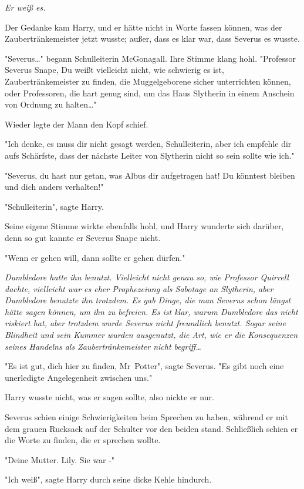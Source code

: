 {\emph{Er weiß es.}

Der Gedanke kam Harry, und er hätte nicht in Worte fassen können, was der Zaubertränkemeister jetzt wusste; außer, dass es klar war, dass Severus es wusste.

"Severus…" begann Schulleiterin McGonagall. Ihre Stimme klang hohl. "Professor Severus Snape, Du weißt vielleicht nicht, wie schwierig es ist, Zaubertränkemeister zu finden, die Muggelgeborene sicher unterrichten können, oder Professoren, die hart genug sind, um das Haus Slytherin in einem Anschein von Ordnung zu halten…"

Wieder legte der Mann den Kopf schief.

"Ich denke, es muss dir nicht gesagt werden, Schulleiterin, aber ich empfehle dir aufs Schärfste, dass der nächste Leiter von Slytherin nicht so sein sollte wie ich."

"Severus, du hast nur getan, was Albus dir aufgetragen hat! Du könntest bleiben und dich anders verhalten!"

"Schulleiterin", sagte Harry.

Seine eigene Stimme wirkte ebenfalls hohl, und Harry wunderte sich darüber, denn so gut kannte er Severus Snape nicht.

"Wenn er gehen will, dann sollte er gehen dürfen."

\emph{Dumbledore hatte ihn benutzt. Vielleicht nicht genau so, wie Professor Quirrell dachte, vielleicht war es eher Prophezeiung als Sabotage an Slytherin, aber Dumbledore benutzte ihn trotzdem. Es gab Dinge, die man Severus schon längst hätte sagen können, um ihn zu befreien. Es ist klar, warum Dumbledore das nicht riskiert hat, aber trotzdem wurde Severus nicht freundlich benutzt. Sogar seine Blindheit und sein Kummer wurden ausgenutzt, die Art, wie er die Konsequenzen seines Handelns als Zaubertränkemeister nicht begriff…}

"Es ist gut, dich hier zu finden, Mr~Potter", sagte Severus. "Es gibt noch eine unerledigte Angelegenheit zwischen uns."

Harry wusste nicht, was er sagen sollte, also nickte er nur.

Severus schien einige Schwierigkeiten beim Sprechen zu haben, während er mit dem grauen Rucksack auf der Schulter vor den beiden stand. Schließlich schien er die Worte zu finden, die er sprechen wollte.

"Deine Mutter. Lily. Sie war -"

"Ich weiß", sagte Harry durch seine dicke Kehle hindurch.

}
